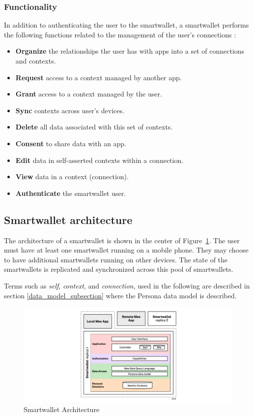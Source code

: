 \documentclass[11pt, oneside]{article}   	%
\begin{document}
\subsubsection{Functionality}

In addition to authenticating the user to the smartwallet, a smartwallet performs the following functions related to the management of the user's connections :

\begin{itemize}
\item \textbf{Organize} the relationships the user has with apps into a set of connections and contexts.
\item \textbf{Request} access to a context managed by another app.
\item \textbf{Grant} access to a context managed by the user.
\item \textbf{Sync} contexts across user's devices.
\item \textbf{Delete} all data associated with this set of contexts.
\item \textbf{Consent} to share data with an app.
\item \textbf{Edit} data in self-asserted contexts within a connection.
\item \textbf{View} data in a context (connection).
\item \textbf{Authenticate} the smartwallet user.
\end{itemize}

\subsection{Smartwallet architecture}

The architecture of a smartwallet is shown in the center of Figure~\ref{fig:architecture}. The user must have at least one smartwallet running on a mobile phone. They may choose to have additional smartwallets running on other devices. The state of the smartwallets is replicated and synchronized across this pool of smartwallets.

Terms such as \emph{self}, \emph{context}, and \emph{connection}, used in the following are described in section \ref{data_model_subsection} where the Persona data model is described.

\begin{figure}[htbp]
\includegraphics[width=\textwidth]{./images/architecture.png}
\caption{Smartwallet Architecture}
\label{fig:architecture}
\end{figure}
\end{document}
